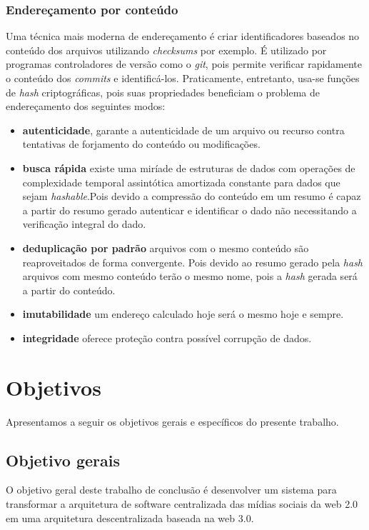 \subsection{Endereçamento por conteúdo}

Uma técnica mais moderna de endereçamento é criar identificadores baseados no conteúdo dos arquivos utilizando \textit{checksums} por exemplo.
É utilizado por programas controladores de versão como o \textit{git}, pois permite verificar rapidamente o conteúdo dos \textit{commits} e identificá-los.
Praticamente, entretanto, usa-se funções de \textit{hash} criptográficas, pois suas propriedades beneficiam o problema de endereçamento dos seguintes modos:

\begin{itemize}
    \item \textbf{autenticidade}, garante a autenticidade de um arquivo ou recurso contra tentativas de forjamento do conteúdo ou modificações.
    \item \textbf{busca rápida} existe uma miríade de estruturas de dados com operações de complexidade temporal assintótica amortizada constante para dados que sejam \textit{hashable}.Pois devido a compressão do conteúdo em um resumo é capaz a partir do resumo gerado autenticar e identificar o dado não necessitando a verificação integral do dado.
    \item \textbf{deduplicação por padrão} arquivos com o mesmo conteúdo são reaproveitados de forma convergente. Pois devido ao resumo gerado pela \textit{hash} arquivos com mesmo conteúdo terão o mesmo nome, pois a \textit{hash} gerada será a partir do conteúdo.
    \item \textbf{imutabilidade} um endereço calculado hoje será o mesmo hoje e sempre.
    \item \textbf{integridade} oferece proteção contra possível corrupção de dados.
\end{itemize}

\chapter{Objetivos}

Apresentamos a seguir os objetivos gerais e específicos do presente trabalho.

\section{Objetivo gerais}

O objetivo geral deste trabalho de conclusão é desenvolver um sistema para transformar a arquitetura de software centralizada das mídias sociais da web 2.0 em uma arquitetura descentralizada baseada na web 3.0.

